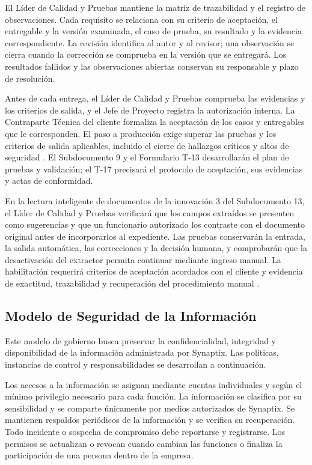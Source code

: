 El Líder de Calidad y Pruebas mantiene la matriz de trazabilidad y el registro de observaciones. Cada requisito se relaciona con su criterio de aceptación, el entregable y la versión examinada, el caso de prueba, su resultado y la evidencia correspondiente. La revisión identifica al autor y al revisor; una observación se cierra cuando la corrección se comprueba en la versión que se entregará. Los resultados fallidos y las observaciones abiertas conservan su responsable y plazo de resolución.

Antes de cada entrega, el Líder de Calidad y Pruebas comprueba las evidencias y los criterios de salida, y el Jefe de Proyecto registra la autorización interna. La Contraparte Técnica del cliente formaliza la aceptación de los casos y entregables que le corresponden. El paso a producción exige superar las pruebas y los criterios de salida aplicables, incluido el cierre de hallazgos críticos y altos de seguridad \parencite[sec.~20.1, p.~34]{bases-transversales}. El Subdocumento 9 y el Formulario T-13 desarrollarán el plan de pruebas y validación; el T-17 precisará el protocolo de aceptación, sus evidencias y actas de conformidad.

En la lectura inteligente de documentos de la innovación 3 del Subdocumento 13, el Líder de Calidad y Pruebas verificará que los campos extraídos se presenten como sugerencias y que un funcionario autorizado los contraste con el documento original antes de incorporarlos al expediente. Las pruebas conservarán la entrada, la salida automática, las correcciones y la decisión humana, y comprobarán que la desactivación del extractor permita continuar mediante ingreso manual. La habilitación requerirá criterios de aceptación acordados con el cliente y evidencia de exactitud, trazabilidad y recuperación del procedimiento manual \parencite[RT-18.03 y RT-18.05 a RT-18.07, p.~32]{bases-transversales}.


\subsection{Modelo de Seguridad de la Información}

Este modelo de gobierno busca preservar la
confidencialidad, integridad y disponibilidad de la información
administrada por Synaptix. Las políticas, instancias de control y responsabilidades se desarrollan a continuación.

Los accesos a la información se asignan mediante cuentas individuales y según el mínimo
privilegio necesario para cada función. La información se clasifica
por su sensibilidad y se comparte únicamente por medios autorizados de Synaptix.
Se mantienen respaldos periódicos de la información y se verifica su recuperación. Todo incidente
o sospecha de compromiso debe reportarse y registrarse. Los permisos
se actualizan o revocan cuando cambian las funciones o finaliza la
participación de una persona dentro de la empresa.

